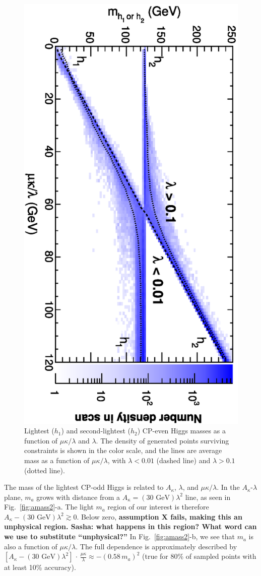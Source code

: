 \documentclass[aps,12pt,superscriptaddress,nofootinbib,floatfix,showpacs]{revtex4}
\begin{document}
\begin{figure}
\includegraphics[height=0.7\linewidth, angle=90]{plots/newbranching/smass12_vs_mkovel.eps}
\caption{Lightest ($h_1$) and second-lightest ($h_2$)
  CP-even Higgs masses as a function of $\mu\kappa/\lambda$ and
  $\lambda$.  The density of generated points surviving constraints is
  shown in the color scale, and the lines are average mass as a function of 
  $\mu\kappa/\lambda$, with $\lambda < 0.01$ (dashed line) and 
  $\lambda > 0.1$ (dotted line). \label{fig:hmass_mukoverl}}
\end{figure}

The mass of the lightest CP-odd Higgs is related to $A_\kappa$,
$\lambda$, and $\mu\kappa/\lambda$.  In the $A_\kappa$-$\lambda$
plane, $m_a$ grows with distance from a $A_\kappa =
(\mbox{30~GeV})\lambda^2$ line, as seen in Fig.~\ref{fig:amass2}-a.
The light $m_a$ region of our interest is therefore $A_\kappa -
(\mbox{30~GeV})\lambda^2 \gtrsim 0$.  Below zero, {\bf assumption X
  fails, making this an unphysical region.  Sasha: what happens in
  this region?  What word can we use to substitute ``unphysical?''}
In Fig.~\ref{fig:amass2}-b, we see that $m_a$ is also a function of
$\mu\kappa/\lambda$.  The full dependence is approximately described
by $\left[A_\kappa - (\mbox{30~GeV}) \lambda^2\right] \, \cdot \,
\frac{\mu\kappa}{\lambda} \approx -(0.58 \, m_a)^2$ (true for 80\% of
sampled points with at least 10\% accuracy).
\end{document}
